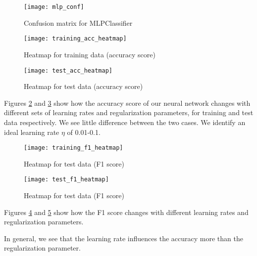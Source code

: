 \documentclass[11pt,english, A4]{article}
\begin{document}
\begin{figure}[H]
\begin{center}
  \texttt{[image: mlp\_conf]}
  \caption{Confusion matrix for MLPClassifier}
  \label{fig:mlp_conf}
  \end{center}
\end{figure}

\begin{figure}[H]
\begin{center}
  \texttt{[image: training\_acc\_heatmap]}
  \caption{Heatmap for training data (accuracy score)}
  \label{fig:train_acc_heatmap}
  \end{center}
\end{figure}

\begin{figure}[H]
\begin{center}
  \texttt{[image: test\_acc\_heatmap]}
  \caption{Heatmap for test data (accuracy score)}
  \label{fig:test_acc_heatmap}
  \end{center}
\end{figure}

Figures \ref{fig:train_acc_heatmap} and \ref{fig:test_acc_heatmap} show how the accuracy score of our neural network changes with different sets of learning rates and regularization parameters, for training and test data respectively. We see little difference between the two cases. We identify an ideal learning rate $\eta$ of 0.01-0.1.

\begin{figure}[H]
\begin{center}
  \texttt{[image: training\_f1\_heatmap]}
  \caption{Heatmap for test data (F1 score)}
  \label{fig:train_f1_heatmap}
  \end{center}
\end{figure}

\begin{figure}[H]
\begin{center}
  \texttt{[image: test\_f1\_heatmap]}
  \caption{Heatmap for test data (F1 score)}
  \label{fig:test_f1_heatmap}
  \end{center}
\end{figure}

Figures \ref{fig:train_f1_heatmap} and \ref{fig:test_f1_heatmap} show how the F1 score changes with different learning rates and regularization parameters.

In general, we see that the learning rate influences the accuracy more than the regularization parameter.
\end{document}
